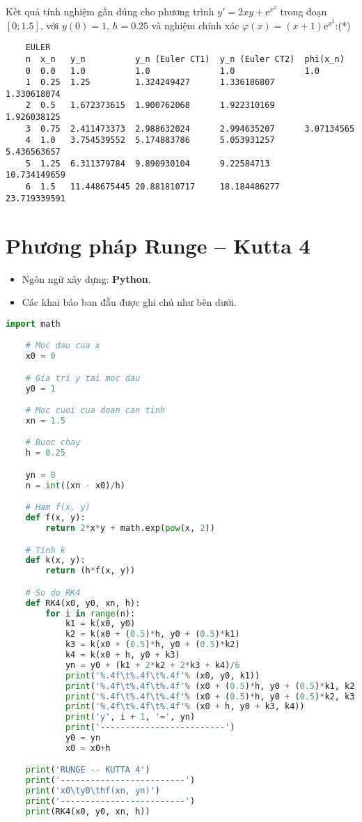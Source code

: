 Kết quả tính nghiệm gần đúng cho phương trình $y'=2xy+\mathrm{e}^{x^2}$ trong đoạn $[0;1.5]$, với $y(0)=1$, $h=0.25$ và nghiệm chính xác $\varphi(x)=(x+1)\mathrm{e}^{x^2}$:\hfill(*)
\begin{lstlisting}
	EULER
	n  x_n   y_n          y_n (Euler CT1)  y_n (Euler CT2)  phi(x_n)
	0  0.0   1.0          1.0              1.0              1.0
	1  0.25  1.25         1.324249427      1.336186807      1.330618074
	2  0.5   1.672373615  1.900762068      1.922310169      1.926038125
	3  0.75  2.411473373  2.988632024      2.994635207      3.07134565
	4  1.0   3.754539552  5.174883786      5.053931257      5.436563657
	5  1.25  6.311379784  9.890930104      9.22584713       10.734149659
	6  1.5   11.448675445 20.881810717     18.184486277     23.719339591
\end{lstlisting}

\section{Phương pháp Runge – Kutta 4}
\begin{itemize}
	\item Ngôn ngữ xây dựng: \textbf{Python}.
	\item Các khai báo ban đầu được ghi chú như bên dưới.
\end{itemize}

\begin{lstlisting}[language=Python]
	import math

	# Moc dau cua x
	x0 = 0

	# Gia tri y tai moc dau
	y0 = 1

	# Moc cuoi cua doan can tinh
	xn = 1.5

	# Buoc chay
	h = 0.25

	yn = 0
	n = int((xn - x0)/h)

	# Ham f(x, y)
	def f(x, y):
		return 2*x*y + math.exp(pow(x, 2))

	# Tinh k
	def k(x, y):
		return (h*f(x, y))

	# So do RK4
	def RK4(x0, y0, xn, h):
	    for i in range(n):
	        k1 = k(x0, y0)
	        k2 = k(x0 + (0.5)*h, y0 + (0.5)*k1)
	        k3 = k(x0 + (0.5)*h, y0 + (0.5)*k2)
	        k4 = k(x0 + h, y0 + k3)
	        yn = y0 + (k1 + 2*k2 + 2*k3 + k4)/6
	        print('%.4f\t%.4f\t%.4f'% (x0, y0, k1))
	        print('%.4f\t%.4f\t%.4f'% (x0 + (0.5)*h, y0 + (0.5)*k1, k2))
	        print('%.4f\t%.4f\t%.4f'% (x0 + (0.5)*h, y0 + (0.5)*k2, k3))
	        print('%.4f\t%.4f\t%.4f'% (x0 + h, y0 + k3, k4))
	        print('y', i + 1, '=', yn)
	        print('-------------------------')
	        y0 = yn
	        x0 = x0+h

	print('RUNGE -- KUTTA 4')
	print('-------------------------')
	print('x0\ty0\thf(xn, yn)')
	print('-------------------------')
	print(RK4(x0, y0, xn, h))
\end{lstlisting}

